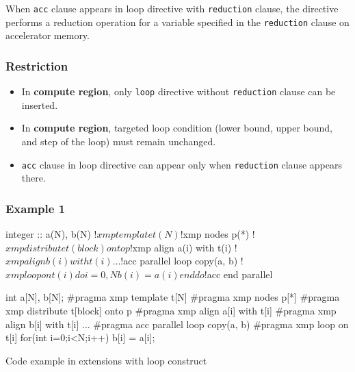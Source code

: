 When {\tt acc} clause appears in {\XMP} loop directive with {\tt reduction} clause,
the directive performs a reduction operation for a variable specified in
the {\tt reduction} clause on accelerator memory.

\subsubsection*{Restriction}
\begin{itemize}
\item In {\OACC} {\bf compute region},
only {\XMP} {\tt loop} directive without {\tt reduction} clause can be inserted.
\item In {\OACC} {\bf compute region},
targeted loop condition (lower bound, upper bound, and step of the loop)
	  must remain unchanged. 
\item {\tt acc} clause in {\XMP} loop directive can appear only when
	  {\tt reduction} clause appears there.
\end{itemize}

\subsubsection*{Example 1}
\begin{myfigure}
\begin{minipage}{0.45\hsize}
\begin{center}
\begin{XACCFexampleL}
integer :: a(N), b(N)
!$xmp template t(N)
!$xmp nodes p(*)
!$xmp distribute t(block) onto p
!$xmp align a(i) with t(i)
!$xmp align b(i) with t(i)
...
!$acc parallel loop copy(a, b)
!$xmp loop on t(i)
do i=0, N
  b(i) = a(i)
end do
!$acc end parallel
\end{XACCFexampleL}
\end{center}
\end{minipage}
%
\begin{minipage}{0.53\hsize}
\begin{center}
\begin{XACCCexampleR}
int a[N], b[N];
#pragma xmp template t[N]
#pragma xmp nodes p[*]
#pragma xmp distribute t[block] onto p
#pragma xmp align a[i] with t[i]
#pragma xmp align b[i] with t[i]
...
#pragma acc parallel loop copy(a, b)
#pragma xmp loop on t[i]
for(int i=0;i<N;i++){
  b[i] = a[i];
}

\end{XACCCexampleR}
\end{center}
\end{minipage}
\caption{Code example in {\XMP} extensions with {\OACC} loop
  construct}\label{code:ex-oacc-loop}
\end{myfigure}


